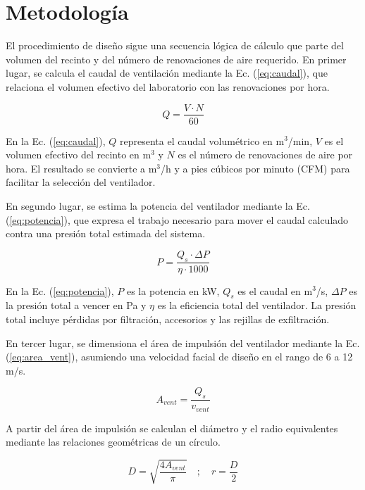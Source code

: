 \section{Metodología}

El procedimiento de diseño sigue una secuencia lógica de cálculo que parte del volumen del recinto y del número de renovaciones de aire requerido. En primer lugar, se calcula el caudal de ventilación mediante la Ec. (\ref{eq:caudal}), que relaciona el volumen efectivo del laboratorio con las renovaciones por hora.

\begin{equation}
	Q = \frac{V \cdot N}{60}
	\label{eq:caudal}
\end{equation}

En la Ec. (\ref{eq:caudal}), $Q$ representa el caudal volumétrico en m$^3$/min, $V$ es el volumen efectivo del recinto en m$^3$ y $N$ es el número de renovaciones de aire por hora. El resultado se convierte a m$^3$/h y a pies cúbicos por minuto (CFM) para facilitar la selección del ventilador.

En segundo lugar, se estima la potencia del ventilador mediante la Ec. (\ref{eq:potencia}), que expresa el trabajo necesario para mover el caudal calculado contra una presión total estimada del sistema.

\begin{equation}
	P = \frac{Q_s \cdot \Delta P}{\eta \cdot 1000}
	\label{eq:potencia}
\end{equation}

En la Ec. (\ref{eq:potencia}), $P$ es la potencia en kW, $Q_s$ es el caudal en m$^3$/s, $\Delta P$ es la presión total a vencer en Pa y $\eta$ es la eficiencia total del ventilador. La presión total incluye pérdidas por filtración, accesorios y las rejillas de exfiltración.

En tercer lugar, se dimensiona el área de impulsión del ventilador mediante la Ec. (\ref{eq:area_vent}), asumiendo una velocidad facial de diseño en el rango de 6 a 12 m/s.

\begin{equation}
	A_{vent} = \frac{Q_s}{v_{vent}}
	\label{eq:area_vent}
\end{equation}

A partir del área de impulsión se calculan el diámetro y el radio equivalentes mediante las relaciones geométricas de un círculo.

\begin{equation}
	D = \sqrt{\frac{4 A_{vent}}{\pi}} \quad ; \quad r = \frac{D}{2}
	\label{eq:diametro}
\end{equation}

